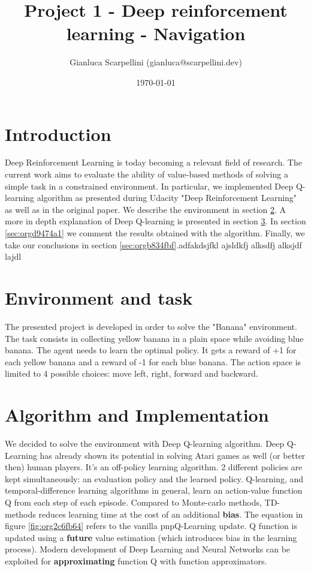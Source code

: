 \documentclass[11pt]{article}
\author{Gianluca Scarpellini (gianluca@scarpellini.dev)}
\date{\today}
\title{Project 1 - Deep reinforcement learning - Navigation}
\begin{document}
\maketitle
\tableofcontents


\section{Introduction}
\label{sec:orgf66c2d6}
Deep Reinforcement Learning is today becoming a relevant field of research. The
current work aims to evaluate the ability of value-based methods of solving a
simple task in a constrained environment. In particular, we implemented Deep
Q-learning algorithm as presented during Udacity "Deep Reinforcement Learning"
as well as in the original paper. We describe the environment in section
\ref{sec:org0c7964a}. A more in depth explanation of Deep Q-learning is presented in
section \ref{sec:orgf78720e}. In section \ref{sec:orgd9474a1} we comment the results
obtained with the algorithm. Finally, we take our conclusions in section
\ref{sec:orgb834fbf}.adfakdsjfkl ajsldkfj alksdfj alksjdf lajdl



\section{Environment and task}
\label{sec:org0c7964a}
The presented project is developed in order to solve the "Banana"
environment. The task consists in collecting yellow banana in a plain space
while avoiding blue banana. The agent needs to learn the optimal policy. It gets
a reward of +1 for each yellow banana and a reward of -1 for each blue
banana. The action space is limited to 4 possible choices: move left, right,
forward and backward. 

\section{Algorithm and Implementation}
\label{sec:orgf78720e}
We decided to solve the environment with Deep Q-learning algorithm. Deep
Q-Learning has already shown its potential in solving Atari games as well (or
better then) human players. It's an off-policy learning algorithm. 2 different
policies are kept simultaneously: an evaluation policy and the learned
policy. Q-learning, and temporal-difference learning algorithms in general,
learn an action-value function Q from each step of each episode. Compared to
Monte-carlo methods, TD-methods reduces learning time at the cost of an
additional \textbf{bias}. The equation in figure \ref{fig:org2c6fb64} refers to the vanilla
pnpQ-Learning update. Q function is updated using a \textbf{future} value estimation
(which introduces bias in the learning process). Modern development of Deep
Learning and Neural Networks can be exploited for \textbf{approximating} function Q
with function approximators. 
\end{document}
